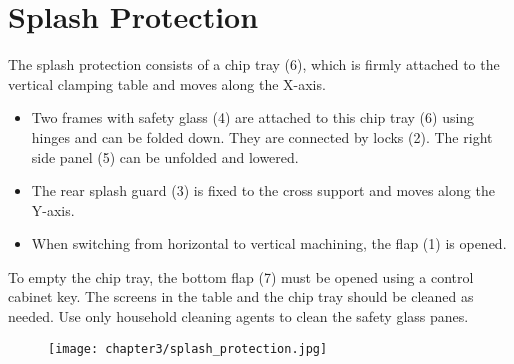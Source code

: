 
\section{Splash Protection}

\setcounter{section}{24}

The splash protection consists of a chip tray (6), which is firmly attached to the vertical clamping table and moves along the X-axis.

\begin{itemize}
    \item Two frames with safety glass (4) are attached to this chip tray (6) using hinges and can be folded down. They are connected by locks (2). The right side panel (5) can be unfolded and lowered.
    \item The rear splash guard (3) is fixed to the cross support and moves along the Y-axis.
    \item When switching from horizontal to vertical machining, the flap (1) is opened.
\end{itemize}


\noindent To empty the chip tray, the bottom flap (7) must be opened using a control cabinet key. The screens in the table and the chip tray should be cleaned as needed. Use only household cleaning agents to clean the safety glass panes.

\vspace{.5cm}


\begin{figure}[h]
    \centering
    \texttt{[image: chapter3/splash\_protection.jpg]}
\end{figure}
